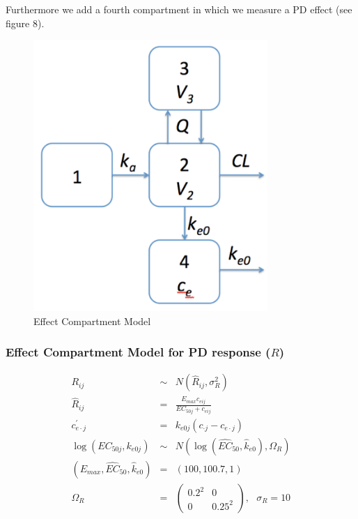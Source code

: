 \documentclass[11pt]{amsart}
\begin{document}
Furthermore we add a fourth compartment in which we measure a PD effect (see figure 8).

\begin{figure}[htbp]
\includegraphics[width=3.5in,trim=0in 0in 0 0in]{graphics/effectCptModel.pdf}
\caption{Effect Compartment Model}
\label{effCptModel}
\end{figure}

\subsubsection*{Effect Compartment Model for PD response ($R$)}
\begin{eqnarray*}
R_{ij} &\sim& N\left(\widehat{R}_{ij},\sigma_{R}^2\right) \\
\widehat{R}_{ij} &=& \frac{E_{max}c_{eij}}{EC_{50j} + c_{eij}} \\
c_{e\cdot j}^\prime &=& k_{e0j}\left(c_{\cdot j} - c_{e\cdot j}\right) \\
\log\left(EC_{50j}, k_{e0j}\right) &\sim& N\left(\log\left(\widehat{EC}_{50}, \widehat{k}_{e0}\right),\Omega_R\right) \\
\left(E_{max}, \widehat{EC}_{50},\widehat{k}_{e0}\right) &=& \left(100, 100.7, 1\right) \\
\Omega_R &=& \left(\begin{array}{cc} 0.2^2 & 0 \\ 0 & 0.25^2  \end{array}\right), \ \ \ \sigma_R = 10
\end{eqnarray*}
\end{document}
